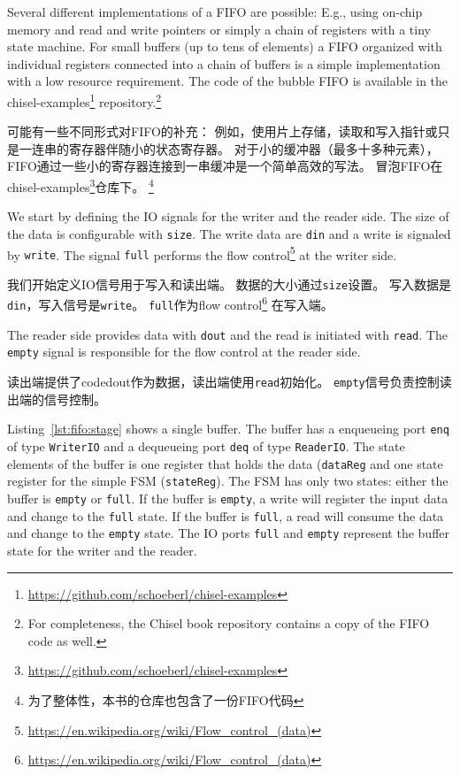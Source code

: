 \documentclass[%
    10pt,
    headinclude, footexclude,
    openright, %
    notitlepage,
    cleardoubleempty,
    headsepline,
    pointlessnumbers,
    bibtotoc, idxtotoc,
    ]{scrbook}
\newcommand{\code}[1]{{\small{\texttt{#1}}}}
\newcommand{\myref}[2]{\href{#1}{#2}}
\renewcommand{\myref}[2]{{#2}{\footnote{\url{#1}}}}
\begin{document}
Several different implementations of a FIFO are possible: E.g., using on-chip
memory and read and write pointers or simply a chain of registers with a
tiny state machine. For small buffers (up to tens of elements) a FIFO organized
with individual registers connected into a chain of buffers is a simple
implementation with a low resource requirement.
The code of the bubble FIFO is available in the
\myref{https://github.com/schoeberl/chisel-examples}{chisel-examples}
repository.\footnote{For completeness, the Chisel book repository contains
a copy of the FIFO code as well.}

可能有一些不同形式对FIFO的补充：
例如，使用片上存储，读取和写入指针或只是一连串的寄存器伴随小的状态寄存器。
对于小的缓冲器（最多十多种元素）， FIFO通过一些小的寄存器连接到一串缓冲是一个简单高效的写法。
冒泡FIFO在\myref{https://github.com/schoeberl/chisel-examples}{chisel-examples}仓库下。
\footnote{为了整体性，本书的仓库也包含了一份FIFO代码}


We start by defining the IO signals for the writer and the reader side.
The size of the data is configurable with \code{size}.
The write data are \code{din} and a write is signaled by \code{write}.
The signal \code{full} performs the
\myref{https://en.wikipedia.org/wiki/Flow_control_(data)}{flow control}
at the writer side.

我们开始定义IO信号用于写入和读出端。
数据的大小通过\code{size}设置。
写入数据是\code{din}，写入信号是\code{write}。
\code{full}作为\myref{https://en.wikipedia.org/wiki/Flow_control_(data)}{flow control}
在写入端。


The reader side provides data with \code{dout} and the read is initiated
with \code{read}. The \code{empty} signal is responsible for the flow control
at the reader side.

读出端提供了code{dout}作为数据，读出端使用\code{read}初始化。
\code{empty}信号负责控制读出端的信号控制。


Listing~\ref{lst:fifo:stage} shows a single buffer. The buffer has a enqueueing port
\code{enq} of type \code{WriterIO} and a dequeueing port \code{deq} of type
\code{ReaderIO}. The state elements of the buffer is one register that holds the
data (\code{dataReg} and one state register for the simple FSM (\code{stateReg}).
The FSM has only two states: either the buffer is \code{empty} or \code{full}.
If the buffer is \code{empty}, a write will register the input data and change
to the \code{full} state.
If the buffer is \code{full}, a read will consume the data and change to the
\code{empty} state.
The IO ports \code{full} and \code{empty} represent the buffer state for
the writer and the reader.
\end{document}
